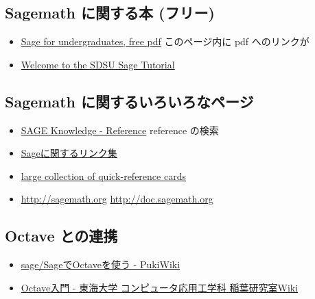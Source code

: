 \documentclass[dvipdfmx,11pt]{jarticle}
\begin{document}
\subsection{Sagemath に関する本 (フリー)}
\label{sec:org05bb385}

\begin{itemize}
\item \href{http://www.gregorybard.com/Sage.html}{Sage for undergraduates, free pdf}   このページ内に pdf へのリンクが

\item \href{http://mosullivan.sdsu.edu/Teaching/sdsu-sage-tutorial/index.html}{Welcome to the SDSU Sage Tutorial}
\end{itemize}

\subsection{Sagemath に関するいろいろなページ}
\label{sec:org9f9d3af}

\begin{itemize}
\item \href{http://sk.sagepub.com/reference}{SAGE Knowledge - Reference} reference の検索

\item \href{https://qiita.com/HirofumiYashima/items/6bb5770961a3b7d33118}{Sageに関するリンク集}

\item \href{http://wiki.sagemath.org/quickref}{large collection of quick-reference cards}

\item \url{http://sagemath.org} \url{http://doc.sagemath.org}
\end{itemize}


\subsection{Octave との連携}
\label{sec:org02daf40}

\begin{itemize}
\item \href{http://www.pwv.co.jp/\%7Etake/TakeWiki/index.php?sage\%2FSage\%E3\%81\%A7Octave\%E3\%82\%92\%E4\%BD\%BF\%E3\%81\%86}{sage/SageでOctaveを使う - PukiWiki}

\item \href{http://www.inaba-lab.org/wiki/index.php/Octave\%E5\%85\%A5\%E9\%96\%80}{Octave入門 - 東海大学 コンピュータ応用工学科 稲葉研究室Wiki}
\end{itemize}
\end{document}

